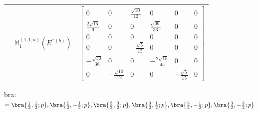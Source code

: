 \documentclass[fleqn,8pt,landscape]{jsarticle}
\begin{document}
\begin{longtable}{ccc}
$  $ & $ \mathbb{M}_{1}^{(1,1;a)}(E^{\prime\prime(b)}) $ & $ \begin{bmatrix} 0 & 0 & \frac{\sqrt{10}}{12} & 0 & 0 & 0 \\ \frac{2 \sqrt{15}}{9} & 0 & 0 & \frac{\sqrt{30}}{36} & 0 & 0 \\ 0 & 0 & 0 & 0 & 0 & 0 \\ 0 & 0 & - \frac{\sqrt{5}}{15} & 0 & 0 & 0 \\ - \frac{\sqrt{30}}{36} & 0 & 0 & - \frac{2 \sqrt{15}}{45} & 0 & 0 \\ 0 & - \frac{\sqrt{10}}{12} & 0 & 0 & - \frac{\sqrt{5}}{15} & 0 \end{bmatrix} $ \\ \hline
\end{longtable}
bra: $=\bra{\frac{1}{2},\frac{1}{2};p}, \bra{\frac{1}{2},- \frac{1}{2};p}, \bra{\frac{3}{2},\frac{3}{2};p}, \bra{\frac{3}{2},\frac{1}{2};p}, \bra{\frac{3}{2},- \frac{1}{2};p}, \bra{\frac{3}{2},- \frac{3}{2};p}$
\end{document}
